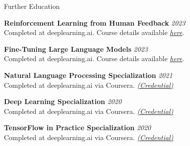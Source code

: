 \documentclass[
	11pt, %
]{./assets/resume} %
\begin{document}
\begin{rSection}{Further Education}

\textbf{Reinforcement Learning from Human Feedback} \textit{\hfill{2023}}\\
Completed at deeplearning.ai. Course details available \href{https://www.deeplearning.ai/short-courses/reinforcement-learning-from-human-feedback/}{{\textit{here}}}.

\textbf{Fine-Tuning Large Language Models} \textit{\hfill{2023}}\\
Completed at deeplearning.ai. Course details available \href{https://www.deeplearning.ai/short-courses/finetuning-large-language-models/}{{\textit{here}}}.

\textbf{Natural Language Processing Specialization} \textit{\hfill{2021}}\\
Completed at deeplearning.ai via Coursera. \href{https://www.coursera.org/account/accomplishments/specialization/7SLFW68RURSM}{{\textit{(Credential)}}}

\textbf{Deep Learning Specialization} \textit{\hfill{2020}}\\
Completed at deeplearning.ai via Coursera. \href{https://www.coursera.org/account/accomplishments/specialization/MPFQGA5XW7YA}{{\textit{(Credential)}}}

\textbf{TensorFlow in Practice Specialization} \textit{\hfill{2020}}\\
Completed at deeplearning.ai via Coursera. \href{https://www.coursera.org/account/accomplishments/specialization/ZBXQR5GS6HGZ}{{\textit{(Credential)}}}

\end{rSection}







\end{document}
